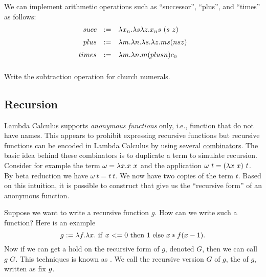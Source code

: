 \begin{gram}
We can implement arithmetic operations such as ``successor'', ``plus'', and ``times'' as follows:
\[
\begin{array}{rcl}
succ  & := & \lambda x_n. \lambda s \lambda z. x_n s~ (s~ z)
\\[2mm]
plus  & := & \lambda m. \lambda n. \lambda s. \lambda z. m s (n s z)
\\[2mm]
times & := & \lambda m. \lambda n. m (plus n) c_0
\\[2mm]
\end{array}
\]
\end{gram}

\begin{exercise}
Write the subtraction operation for church numerals.
\end{exercise}

\subsection{Recursion}

Lambda Calculus supports {\em anonymous functions} only, i.e.,
function that do not have names.  
%
This appears to prohibit expressing recursive functions but recursive functions can be encoded in Lambda Calculus by using several 
\href{def:lcs::open-closed}{combinators}.
%
The basic idea behind these combinators is to duplicate a term to simulate recursion.
%
Consider for example the term $\omega = \lambda x. x~x$ and the application
$\omega~ t = (\lambda x~ x)~ t $.  
%
By beta reduction we have $\omega~ t =
t~ t $.  We now have two copies of the term $t$.  Based on this
intuition, it is possible to construct 
that give us the ``recursive form'' of an anonymous function.

\begin{gram}
Suppose we want to write a recursive function $g$.  How can we
write such a function?  Here is an example
\[
g   := \lambda f. \lambda x.~\mathrm{if}~x <= 0~\mathrm{then}~1~\mathrm{else}~x*f (x-1). 
\]
Now if we can get a hold on the recursive form of $g$, denoted $G$, then we can call $g$ $G$.
%
This techniques is known as .
%
%
We call the recursive version $G$ of $g$, the  of $g$,
written as $\mathrm{fix}~g$.
\end{gram}

